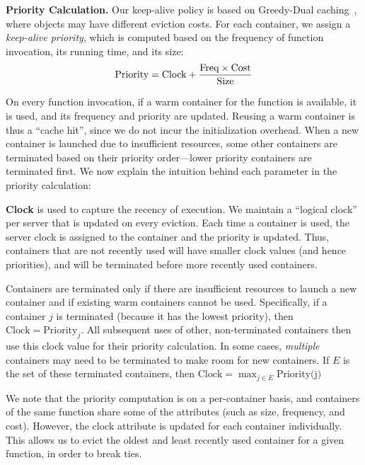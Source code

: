 \noindent \textbf{Priority Calculation.} 
Our keep-alive policy is based on Greedy-Dual  caching~\cite{young_gd_orig_94}, where objects may have  different eviction costs. 
%
For each container, we assign a \emph{keep-alive priority}, which is computed based on the frequency of function invocation, its running time, and its size:
%
\vspace*{-7pt}
\begin{equation}
  \vspace*{-3pt}
  \text{Priority} = \text{Clock} + \frac{\text{Freq} \times \text{Cost}} {\text{Size}}
    \label{eq:prio-prop}
\end{equation}
%
% 

On every function invocation, if a warm container for the function is available, it is used, and its frequency and priority are updated.
Reusing a warm container is thus a ``cache hit'', since we do not incur the initialization overhead. 
When a new container is launched due to insufficient resources, some other containers are terminated based on their priority order---lower priority containers are terminated first. 
We now explain the intuition behind each parameter in the priority calculation:



\noindent \textbf{Clock} is used to capture the recency of execution.
We maintain a ``logical clock'' per server that is updated on every eviction. 
Each time a container is used, the server clock is assigned to the container and the priority is updated.  
Thus, containers that are not recently used will have smaller clock values (and hence priorities), and will be terminated before more recently used containers. 

Containers are terminated only if there are insufficient resources to launch a new container and if existing warm containers cannot be used.  
Specifically, if a container  $j$ is terminated (because it has the lowest priority), then $\text{Clock} = \text{Priority}_j$.
All subsequent uses of other, non-terminated containers then use this clock value for their priority calculation.
In some cases, \emph{multiple} containers may need to be terminated to make room for new containers.
If $E$ is the set of these terminated containers, then $\text{Clock} = \max_{j \in E}{\text{Priority(j)}}$

We note that the priority computation is on a per-container basis, and containers of the same function share some of the attributes (such as size, frequency, and cost). 
However, the clock attribute is updated for each container individually. 
This allows us to evict the oldest and least recently used container for a given function, in order to break ties. 



